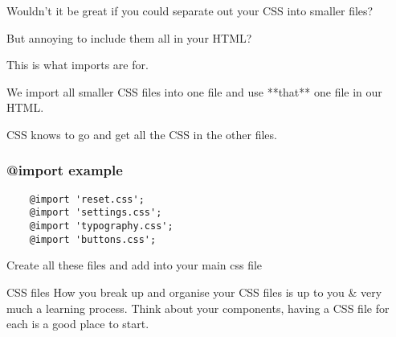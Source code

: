 Wouldn't it be great if you could separate out your CSS into smaller files?

But annoying to include them all in your HTML?

This is what imports are for.

We import all smaller CSS files into one file and use **that** one file in our HTML.

CSS knows to go and get all the CSS in the other files.

\subsubsection{@import example}

\begin{verbatim}
    @import 'reset.css';
    @import 'settings.css';
    @import 'typography.css';
    @import 'buttons.css';
\end{verbatim}

Create all these files and add into your main css file

\begin{infobox}{CSS files}
    How you break up and organise your CSS files is up to you \& very much a learning process. Think about your components, having a CSS file for each is a good place to start.
\end{infobox}

